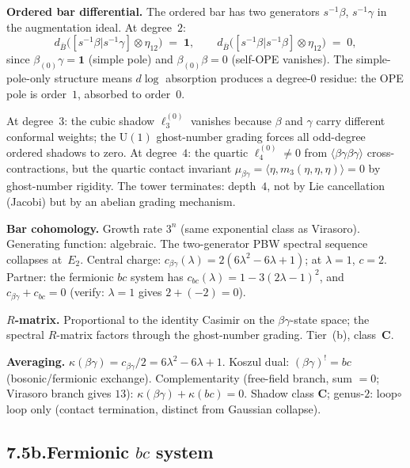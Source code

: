 \documentclass[11pt,reqno]{amsart}
\theoremstyle{definition}
\theoremstyle{remark}
\providecommand{\barB}{\bar{B}}
\numberwithin{equation}{section}
\begin{document}
\medskip\noindent\textbf{Ordered bar differential.}\enspace
The ordered bar has two generators $s^{-1}\beta$, $s^{-1}\gamma$
in the augmentation ideal. At degree~$2$:
\[
d_{\barB}\bigl([s^{-1}\beta|s^{-1}\gamma]\otimes\eta_{12}\bigr)
\;=\;\mathbf{1},
\qquad
d_{\barB}\bigl([s^{-1}\beta|s^{-1}\beta]\otimes\eta_{12}\bigr)
\;=\;0,
\]
since $\beta_{(0)}\gamma=\mathbf{1}$ (simple pole) and
$\beta_{(0)}\beta=0$ (self-OPE vanishes). The simple-pole-only
structure means $d\log$ absorption produces a degree-$0$ residue:
the OPE pole is order~$1$, absorbed to order~$0$.

At degree~$3$: the cubic shadow $\ell_3^{(0)}$ vanishes because
$\beta$ and $\gamma$ carry different conformal weights; the
$\mathrm{U}(1)$ ghost-number grading forces all odd-degree
ordered shadows to zero. At degree~$4$: the quartic
$\ell_4^{(0)}\neq 0$ from $\langle\beta\gamma\beta\gamma\rangle$
cross-contractions, but the quartic contact invariant
$\mu_{\beta\gamma}=\langle\eta,m_3(\eta,\eta,\eta)\rangle=0$
by ghost-number rigidity. The tower terminates: depth~$4$, not
by Lie cancellation (Jacobi) but by an abelian grading mechanism.

\medskip\noindent\textbf{Bar cohomology.}\enspace
Growth rate $3^n$ (same exponential class as Virasoro).
Generating function: algebraic. The two-generator PBW spectral
sequence collapses at~$E_2$. Central charge:
$c_{\beta\gamma}(\lambda)=2(6\lambda^2-6\lambda+1)$; at
$\lambda=1$, $c=2$. Partner: the fermionic $bc$ system has
$c_{bc}(\lambda)=1-3(2\lambda-1)^2$, and $c_{\beta\gamma}+c_{bc}=0$
(verify: $\lambda=1$ gives $2+(-2)=0$).

\medskip\noindent\textbf{$R$-matrix.}\enspace
Proportional to the identity Casimir on the $\beta\gamma$-state
space; the spectral $R$-matrix factors through the ghost-number
grading. Tier~(b), class~$\mathbf{C}$.

\medskip\noindent\textbf{Averaging.}\enspace
$\kappa(\beta\gamma)=c_{\beta\gamma}/2=6\lambda^2-6\lambda+1$.
Koszul dual: $(\beta\gamma)^!=bc$ (bosonic/fermionic exchange).
Complementarity (free-field branch, sum $=0$; Virasoro branch
gives $13$): $\kappa(\beta\gamma)+\kappa(bc)=0$.
Shadow class $\mathbf{C}$; genus-$2$: loop$\circ$loop only
(contact termination, distinct from Gaussian collapse).

\subsection*{7.5b.\quad Fermionic $bc$ system}
\end{document}
